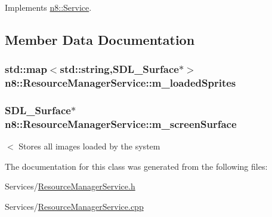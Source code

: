 Implements \hyperlink{classn8_1_1_service_a756a170eba7e5c34a1c12008e22d3ca7}{n8\-::\-Service}.



\subsection{Member Data Documentation}
\hypertarget{classn8_1_1_resource_manager_service_af203735b1015f5cf94024e8857c8c17d}{
\subsubsection[{m\-\_\-loaded\-Sprites}]{\setlength{\rightskip}{0pt plus 5cm}std\-::map$<$std\-::string,S\-D\-L\-\_\-\-Surface$\ast$$>$ n8\-::\-Resource\-Manager\-Service\-::m\-\_\-loaded\-Sprites\hspace{0.3cm}{\ttfamily [private]}}}\label{classn8_1_1_resource_manager_service_af203735b1015f5cf94024e8857c8c17d}
\hypertarget{classn8_1_1_resource_manager_service_a430459934276e8fd19f5501c04569ab5}{
\subsubsection[{m\-\_\-screen\-Surface}]{\setlength{\rightskip}{0pt plus 5cm}S\-D\-L\-\_\-\-Surface$\ast$ n8\-::\-Resource\-Manager\-Service\-::m\-\_\-screen\-Surface\hspace{0.3cm}{\ttfamily [private]}}}\label{classn8_1_1_resource_manager_service_a430459934276e8fd19f5501c04569ab5}
$<$ Stores all images loaded by the system 

The documentation for this class was generated from the following files\-:\begin{DoxyCompactItemize}
\item 
Services/\hyperlink{_resource_manager_service_8h}{Resource\-Manager\-Service.\-h}\item 
Services/\hyperlink{_resource_manager_service_8cpp}{Resource\-Manager\-Service.\-cpp}\end{DoxyCompactItemize}
